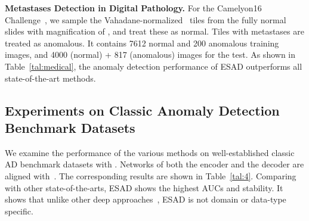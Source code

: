 \documentclass{bmvc2k}
\begin{document}
\noindent\textbf{Metastases Detection in Digital Pathology.}
For the Camelyon16 Challenge~\cite{bejnordi2017diagnostic}, we sample the Vahadane-normalized~\cite{vahadane2016structure}  tiles from the fully normal slides with magnification of , and treat these as normal. Tiles with metastases are treated as anomalous. It contains 7612 normal and 200 anomalous training images, and 4000 (normal) + 817 (anomalous) images for the test. As shown in Table~\ref{tal:medical}, the anomaly detection performance of ESAD outperforms all state-of-the-art methods. 

\subsection{Experiments on Classic Anomaly Detection Benchmark Datasets}
We examine the performance of the various methods on well-established classic AD benchmark datasets \cite{Rayana2016} with . Networks of both the encoder and the decoder are aligned with~\cite{SAD}. The corresponding results are shown in Table~\ref{tal:4}. Comparing with other state-of-the-arts, ESAD shows the highest AUCs and stability. It shows that unlike other deep approaches~\cite{ergen2017unsupervised,Kiran2018An,min2018ids,deecke2018image,golan2018deep}, ESAD is not domain or data-type specific. 

\renewcommand \arraystretch{0.75}
\begin{table}[t]
\centering
\caption{Ablation study on different designs of architecture and loss functions for ESAD on two different datasets. We report the avg. AUC in \% with st. dev. computed over 10 seeds.}
\label{tal:ablation}
\footnotesize
{}
\vspace{-5pt}
\end{table}
\end{document}
